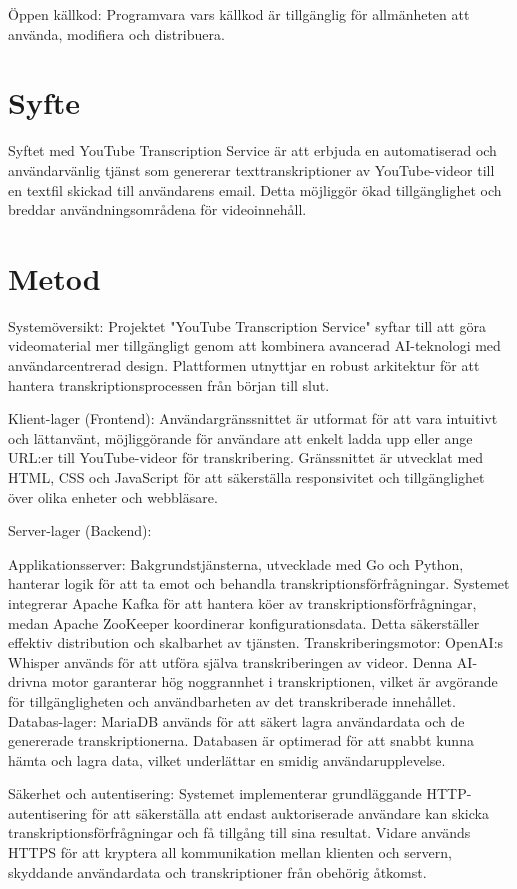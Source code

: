 Öppen källkod: Programvara vars källkod är tillgänglig för allmänheten att använda, modifiera och distribuera.

\section{Syfte}
Syftet med YouTube Transcription Service är att erbjuda en automatiserad och användarvänlig tjänst som genererar texttranskriptioner av YouTube-videor till en textfil skickad till användarens email. Detta möjliggör ökad tillgänglighet och breddar användningsområdena för videoinnehåll.

\section{Metod}
Systemöversikt:
Projektet "YouTube Transcription Service" syftar till att göra videomaterial mer tillgängligt genom att kombinera avancerad AI-teknologi med användarcentrerad design. Plattformen utnyttjar en robust arkitektur för att hantera transkriptionsprocessen från början till slut.

Klient-lager (Frontend):
Användargränssnittet är utformat för att vara intuitivt och lättanvänt, möjliggörande för användare att enkelt ladda upp eller ange URL:er till YouTube-videor för transkribering. Gränssnittet är utvecklat med HTML, CSS och JavaScript för att säkerställa responsivitet och tillgänglighet över olika enheter och webbläsare.

Server-lager (Backend):

Applikationsserver: Bakgrundstjänsterna, utvecklade med Go och Python, hanterar logik för att ta emot och behandla transkriptionsförfrågningar. Systemet integrerar Apache Kafka för att hantera köer av transkriptionsförfrågningar, medan Apache ZooKeeper koordinerar konfigurationsdata. Detta säkerställer effektiv distribution och skalbarhet av tjänsten.
Transkriberingsmotor: OpenAI:s Whisper används för att utföra själva transkriberingen av videor. Denna AI-drivna motor garanterar hög noggrannhet i transkriptionen, vilket är avgörande för tillgängligheten och användbarheten av det transkriberade innehållet.
Databas-lager:
MariaDB används för att säkert lagra användardata och de genererade transkriptionerna. Databasen är optimerad för att snabbt kunna hämta och lagra data, vilket underlättar en smidig användarupplevelse.

Säkerhet och autentisering:
Systemet implementerar grundläggande HTTP-autentisering för att säkerställa att endast auktoriserade användare kan skicka transkriptionsförfrågningar och få tillgång till sina resultat. Vidare används HTTPS för att kryptera all kommunikation mellan klienten och servern, skyddande användardata och transkriptioner från obehörig åtkomst.

